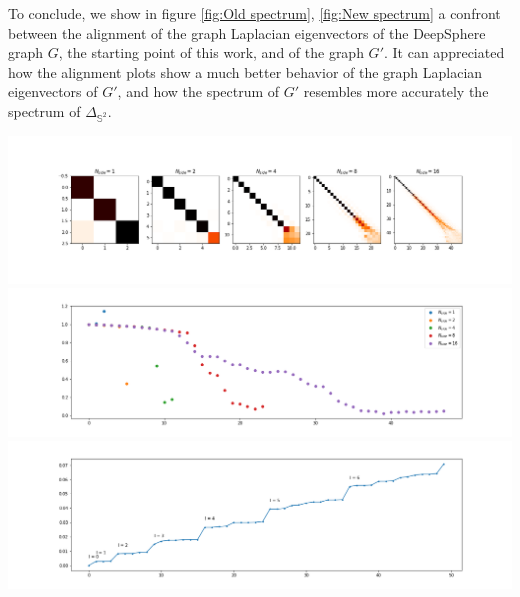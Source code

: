 To conclude, we show in figure \ref{fig:Old spectrum}, \ref{fig:New spectrum} a confront between the alignment of the graph Laplacian eigenvectors of the DeepSphere graph $G$, the starting point of this work, and  of the graph $G'$. It can appreciated how the alignment plots show a much better behavior of the graph Laplacian eigenvectors of $G'$, and how the spectrum of $G'$ resembles more accurately the spectrum of $\Delta_{\mathbb S^2}$.\\
\begin{minipage}{.5\textwidth}
	\centering
	\vspace{0.4cm}
	\includegraphics[width=0.95\linewidth]{../codes/02.HeatKernelGraphLaplacian/HEALPix/06_figures/deepsphere_original.png}
	\includegraphics[width=0.95\linewidth]{../codes/02.HeatKernelGraphLaplacian/HEALPix/06_figures/deepsphere_original_diagonal.png}
	\includegraphics[width=0.95\linewidth]{../codes/02.HeatKernelGraphLaplacian/HEALPix/05_figs/old_results3.png}
\end{minipage}%
